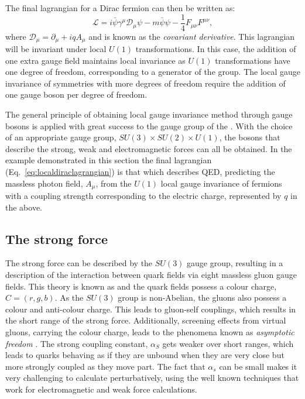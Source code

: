 The final lagrangian for a Dirac fermion can then be written as:
\begin{equation}
  \label{eq:localdiraclagrangian}
  \mathcal{L}=i\bar{\psi}\gamma^{\mu}\mathcal{D}_{\mu}\psi-m\bar{\psi}\psi-\frac{1}{4}F_{\mu\nu}F^{\mu\nu},
\end{equation}
where $\mathcal{D}_{\mu}=\partial_{\mu}+iqA_{\mu}$ and is known as the
\emph{covariant derivative}. This lagrangian will be invariant under
local $U(1)$ transformations. In this case, the addition of one extra
gauge field maintains local invariance as $U(1)$ transformations have
one degree of freedom, corresponding to a generator of the group.
The local gauge invariance of symmetries with more degrees of freedom
require the addition of one gauge boson per degree of freedom. 

The general principle of obtaining local gauge invariance method
through gauge bosons is applied with great success to the gauge group
of the \SM. With the choice of an appropriate gauge group,
$SU(3)\times SU(2) \times U(1)$, the bosons that describe the strong,
weak and electromagnetic forces can all be obtained. In the example
demonstrated in this section the final lagrangian
(Eq.~\ref{eq:localdiraclagrangian}) is that which describes \ac{QED},
predicting the massless photon field, $A_{\mu}$, from the $U(1)$ local
gauge invariance of fermions with a coupling strength corresponding to
the electric charge, represented by $q$ in the above. %

\subsection{The strong force}

The strong force can be described by the $SU(3)$ gauge group,
resulting in a description of the interaction between quark fields
via eight massless gluon gauge fields. This theory is known as \QCD and
the quark fields possess a colour charge, $C=(r,g,b)$. As the
$SU(3)$ group is non-Abelian, the gluons also possess a colour and
anti-colour charge. This leads to gluon-self couplings, which
results in the short range of the strong force. Additionally,
screening effects from virtual gluons, carrying the colour charge,
leads to the phenomena known as \emph{asymptotic freedom}
\cite{PhysRevLett.30.1343}. The strong coupling constant, $\alpha_S$
gets weaker over short ranges, which leads to quarks behaving as if
they are unbound when they are very close but more strongly coupled as
they move part. The fact that $\alpha_s$ can be small makes it very
challenging to calculate \QCD perturbatively, using the well known
techniques that work for electromagnetic and weak force calculations.

